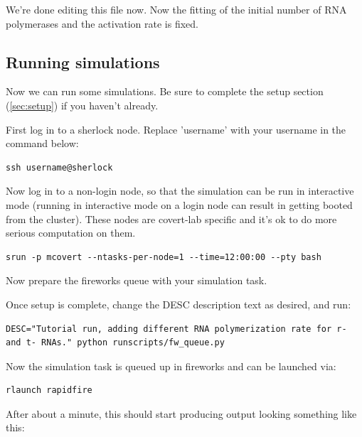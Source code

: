 \documentclass[12pt]{article}
\begin{document}
We’re done editing this file now. Now the fitting of the initial number of RNA polymerases and the activation rate is fixed. 




\subsection{Running simulations}

Now we can run some simulations. Be sure to complete the setup section (\ref{sec:setup}) if you haven't already.
\par
First log in to a sherlock node. Replace 'username' with your username in the command below:

\lstset{language=bash}
\begin{lstlisting}
ssh username@sherlock
\end{lstlisting}

Now log in to a non-login node, so that the simulation can be run in interactive mode (running in interactive mode on a login node can result in getting booted from the cluster). These nodes are covert-lab specific and it's ok to do more serious computation on them.

\begin{lstlisting}
srun -p mcovert --ntasks-per-node=1 --time=12:00:00 --pty bash
\end{lstlisting}

Now prepare the fireworks queue with your simulation task. 
\par
Once setup is complete, change the DESC description text as desired, and run:

\begin{lstlisting}
DESC="Tutorial run, adding different RNA polymerization rate for r- and t- RNAs." python runscripts/fw_queue.py
\end{lstlisting}

Now the simulation task is queued up in fireworks and can be launched via:

\begin{lstlisting}
rlaunch rapidfire
\end{lstlisting}

After about a minute, this should start producing output looking something like this:
\end{document}
